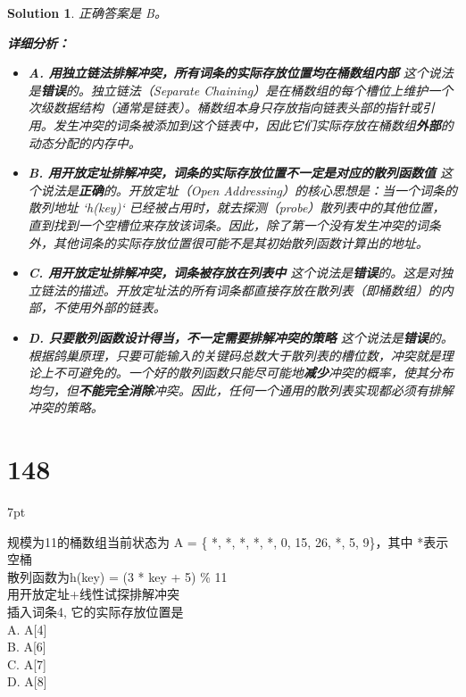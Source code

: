 \documentclass[UTF8]{report}
\newtheorem{solution}{Solution}
\theoremstyle{MyLineTheoremStyle} %
\theoremstyle{MyBlockTheoremStyle} %
\theoremstyle{MySubsubsectionStyle} %
\newenvironment{graybox}{%
        \def\FrameCommand{%
        \hspace{1pt}%
        {\color{gray}\small \vrule width 2pt}%
        {\color{graybox_color}\vrule width 4pt}%
        \colorbox{graybox_color}%
        }%
        \MakeFramed{\advance\hsize-\width\FrameRestore}%
        \noindent\hspace{-4.55pt}%
        \begin{adjustwidth}{}{7pt}%
        \vspace{2pt}\vspace{2pt}%
        }
        {%
        \vspace{2pt}\end{adjustwidth}\endMakeFramed%
        }
\begin{document}
\begin{solution}
正确答案是 B。

\textbf{详细分析：}

\begin{itemize}
    \item \textbf{A. 用独立链法排解冲突，所有词条的实际存放位置均在桶数组内部}
    这个说法是\textbf{错误}的。独立链法（Separate Chaining）是在桶数组的每个槽位上维护一个次级数据结构（通常是链表）。桶数组本身只存放指向链表头部的指针或引用。发生冲突的词条被添加到这个链表中，因此它们实际存放在桶数组\textbf{外部}的动态分配的内存中。

    \item \textbf{B. 用开放定址排解冲突，词条的实际存放位置不一定是对应的散列函数值}
    这个说法是\textbf{正确}的。开放定址（Open Addressing）的核心思想是：当一个词条的散列地址 `h(key)` 已经被占用时，就去探测（probe）散列表中的其他位置，直到找到一个空槽位来存放该词条。因此，除了第一个没有发生冲突的词条外，其他词条的实际存放位置很可能不是其初始散列函数计算出的地址。

    \item \textbf{C. 用开放定址排解冲突，词条被存放在列表中}
    这个说法是\textbf{错误}的。这是对独立链法的描述。开放定址法的所有词条都直接存放在散列表（即桶数组）的内部，不使用外部的链表。

    \item \textbf{D. 只要散列函数设计得当，不一定需要排解冲突的策略}
    这个说法是\textbf{错误}的。根据鸽巢原理，只要可能输入的关键码总数大于散列表的槽位数，冲突就是理论上不可避免的。一个好的散列函数只能尽可能地\textbf{减少}冲突的概率，使其分布均匀，但\textbf{不能完全消除}冲突。因此，任何一个通用的散列表实现都必须有排解冲突的策略。
\end{itemize}
\end{solution}

\section*{148}
\begin{graybox}
规模为11的桶数组当前状态为 A = \{ *,
*, *, *, *, 0, 15, 26, *, 5, 9\}，其中
*表示空桶\\
散列函数为h(key) = (3 * key + 5) \% 11\\
用开放定址+线性试探排解冲突\\
插入词条4, 它的实际存放位置是\\
A. A[4]\\
B. A[6]\\
C. A[7]\\
D. A[8]
\end{graybox}
\end{document}
